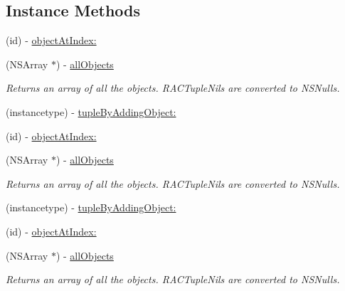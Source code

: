 \subsection*{Instance Methods}
\begin{DoxyCompactItemize}
\item 
(id) -\/ \mbox{\hyperlink{interface_r_a_c_tuple_a70c9deecd1588c4544493a48dfc20660}{object\+At\+Index\+:}}
\item 
\mbox{\label{interface_r_a_c_tuple_a8276e6f6a6d09bad8e44abfee6dcea9b}} 
(N\+S\+Array $\ast$) -\/ \mbox{\hyperlink{interface_r_a_c_tuple_a8276e6f6a6d09bad8e44abfee6dcea9b}{all\+Objects}}
\begin{DoxyCompactList}\small\item\em Returns an array of all the objects. R\+A\+C\+Tuple\+Nils are converted to N\+S\+Nulls. \end{DoxyCompactList}\item 
(instancetype) -\/ \mbox{\hyperlink{interface_r_a_c_tuple_a9ad29985f13aa286f5923ca4c98d30a5}{tuple\+By\+Adding\+Object\+:}}
\item 
(id) -\/ \mbox{\hyperlink{interface_r_a_c_tuple_a70c9deecd1588c4544493a48dfc20660}{object\+At\+Index\+:}}
\item 
\mbox{\label{interface_r_a_c_tuple_a8276e6f6a6d09bad8e44abfee6dcea9b}} 
(N\+S\+Array $\ast$) -\/ \mbox{\hyperlink{interface_r_a_c_tuple_a8276e6f6a6d09bad8e44abfee6dcea9b}{all\+Objects}}
\begin{DoxyCompactList}\small\item\em Returns an array of all the objects. R\+A\+C\+Tuple\+Nils are converted to N\+S\+Nulls. \end{DoxyCompactList}\item 
(instancetype) -\/ \mbox{\hyperlink{interface_r_a_c_tuple_a9ad29985f13aa286f5923ca4c98d30a5}{tuple\+By\+Adding\+Object\+:}}
\item 
(id) -\/ \mbox{\hyperlink{interface_r_a_c_tuple_a70c9deecd1588c4544493a48dfc20660}{object\+At\+Index\+:}}
\item 
\mbox{\label{interface_r_a_c_tuple_a8276e6f6a6d09bad8e44abfee6dcea9b}} 
(N\+S\+Array $\ast$) -\/ \mbox{\hyperlink{interface_r_a_c_tuple_a8276e6f6a6d09bad8e44abfee6dcea9b}{all\+Objects}}
\begin{DoxyCompactList}\small\item\em Returns an array of all the objects. R\+A\+C\+Tuple\+Nils are converted to N\+S\+Nulls. \end{DoxyCompactList}\item 

\end{DoxyCompactItemize}
